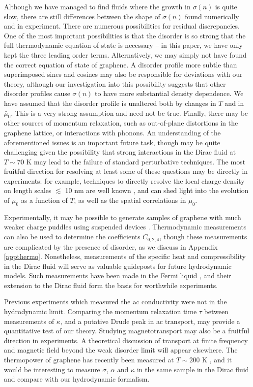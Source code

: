 \documentclass[10pt, oneside]{book}
\begin{document}
\begin{doublespace}
  Although we have managed to find fluids where the growth in $\sigma(n)$ is quite slow, there are still differences between the shape of $\sigma(n)$ found numerically and in experiment.   There are numerous possibilities for residual discrepancies.   One of the most important possibilities is that the disorder is so strong that the full thermodynamic equation of state is necessary -- in this paper, we have only kept the three leading order terms.   Alternatively, we may simply not have found the correct equation of state of graphene.  A disorder profile more subtle than superimposed sines and cosines may also be responsible for deviations with our theory, although our investigation into this possibility suggests that other disorder profiles cause $\sigma(n)$ to have more substantial density dependence.    We have assumed that the disorder profile is unaltered both by changes in $T$ and in $\bar\mu_0$.   This is a very strong assumption and need not be true.   Finally, there may be other sources of momentum relaxation, such as out-of-plane distortions in the graphene lattice, or interactions with phonons.   An understanding of the aforementioned issues is an important future task, though may be quite challenging given the possibility that strong interactions in the Dirac fluid at $T\sim 70$ K may lead to the failure of standard perturbative techniques.   The most fruitful direction for resolving at least some of these questions may be directly in experiments: for example, techniques to directly resolve the local charge density on length scales $\lesssim$ 10 nm are well known \cite{xue}, and can shed light into the evolution of $\mu_0$ as a function of $T$, as well as the spatial correlations in $\mu_0$.
  
Experimentally, it may be possible to generate samples of graphene with much weaker charge puddles using suspended devices \cite{bolotin, mayorov}.  Thermodynamic measurements can also be used to determine the coefficients $C_{0,2,4}$, though these measurements are complicated by the presence of disorder, as we discuss in Appendix \ref{appthermo}.   Nonetheless, measurements of the specific heat and compressibility in the Dirac fluid will serve as valuable guideposts for future hydrodynamic models.   Such measurements have been made in the Fermi liquid \cite{yacoby2007}, and their extension to the Dirac fluid form the basis for worthwhile experiments.

Previous experiments which measured the ac conductivity \cite{horng} were not in the hydrodynamic limit.   Comparing the momentum relaxation time $\tau$ between measurements of $\kappa$, and a putative Drude peak in ac transport, may provide a quantitative test of our theory.   Studying magnetotransport \cite{hkms} may also be a fruitful direction in experiments.  A theoretical discussion of transport at finite frequency and magnetic field beyond the weak disorder limit will appear elsewhere.   The thermopower  of graphene has recently been measured at $T\sim 200$ K \cite{ghahari},  and it would be interesting to measure $\sigma$, $\alpha$ and $\kappa$ in the same sample in the Dirac fluid and compare with our hydrodynamic formalism.



\end{doublespace}
\end{document}
